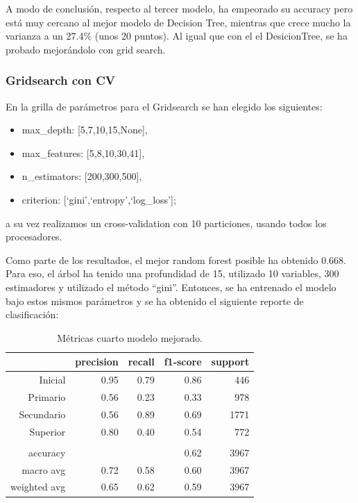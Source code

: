 \documentclass[a4paper]{article}
\begin{document}
            A modo de conclusión, respecto al tercer modelo, ha empeorado su accuracy pero está muy cercano al mejor modelo de Decision Tree, mientras que crece mucho la varianza a un 27.4\% (unos 20 puntos). 
            Al igual que con el el DesicionTree, se ha probado mejorándolo con grid search.

        \subsubsection{Gridsearch con CV}

            En la grilla de parámetros para el Gridsearch se han elegido los siguientes:
            \begin{itemize}
                \item max\_depth: [5,7,10,15,None],
                \item max\_features: [5,8,10,30,41],
                \item n\_estimators: [200,300,500],
                \item criterion: [`gini',`entropy',`log\_loss'];
            \end{itemize}
            a su vez realizamos un cross-validation con 10 particiones, usando todos los procesadores.

           Como parte de los resultados, el mejor random forest posible ha obtenido 0.668. Para eso, el árbol ha tenido una profundidad de 15, utilizado  10  variables,  300  estimadores y utilizado el método ``gini''. Entonces, se ha entrenado el modelo bajo estos mismos parámetros y se ha obtenido el siguiente reporte de clasificación:

            \begin{table}[!ht]
                \centering
                \begin{tabular}{rrrrr}
                    \toprule
                    ~ & precision & recall & f1-score & support \\ \midrule
                    Inicial    & 0.95 & 0.79 & 0.86 & 446 \\
                    Primario   & 0.56 & 0.23 & 0.33 & 978 \\
                    Secundario & 0.56 & 0.89 & 0.69 & 1771 \\
                    Superior   & 0.80 & 0.40 & 0.54 & 772 \\
                    & & & & \\
                    accuracy & & & 0.62 & 3967 \\
                    macro avg & 0.72 & 0.58 & 0.60 & 3967 \\
                    weighted avg & 0.65 & 0.62 & 0.59 & 3967 \\
                    \bottomrule
                \end{tabular}
                \caption{Métricas cuarto modelo mejorado.}
                \label{New fourth model metrics}
            \end{table}
            
\end{document}
